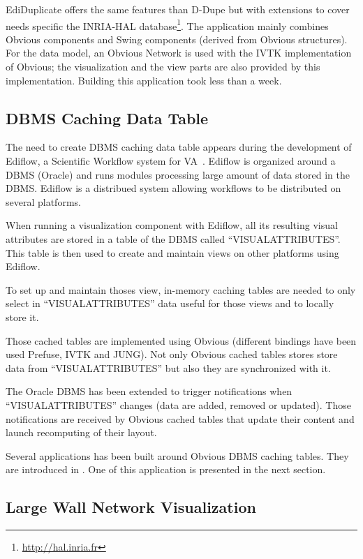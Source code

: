 EdiDuplicate offers the same features than D-Dupe but with extensions
to cover needs specific the INRIA-HAL
database\footnote{\url{http://hal.inria.fr}}. The application mainly
combines Obvious components and Swing components (derived from Obvious
structures). For the data model, an Obvious Network is used with the
IVTK implementation of Obvious; the visualization and the
view parts are also provided by this implementation.  Building this
application took less than a week.

\subsection{DBMS Caching Data Table}
\label{dbmscachingtable}

The need to create DBMS caching data table appears during the development
of Ediflow, a Scientific Workflow system for VA~\cite{Ediflow}.
Ediflow is organized around a DBMS (Oracle) and runs modules processing
large amount of data stored in the DBMS. Ediflow is a distribued system
allowing workflows to be distributed on several platforms.

When running a visualization component with Ediflow, all its resulting
visual attributes are stored in a table of the DBMS called
``VISUALATTRIBUTES''. This table is then used to create and maintain
views on other platforms using Ediflow.

To set up and maintain thoses view, in-memory caching tables are needed
to only select in ``VISUALATTRIBUTES''  data useful for those views
and to locally store it.

Those cached tables are implemented using Obvious (different bindings
have been used Prefuse, IVTK and JUNG). Not only Obvious cached
tables stores store data from ``VISUALATTRIBUTES'' but also they are
synchronized with it.

The Oracle DBMS has been extended to trigger notifications when
``VISUALATTRIBUTES'' changes (data are added, removed or updated). Those
notifications are received by Obvious cached tables that update their
content and launch recomputing of their layout.

Several applications has been built around Obvious DBMS caching
tables. They are introduced in \cite{Ediflow}. One of this application
is presented in the next section.

\subsection{Large Wall Network Visualization}

